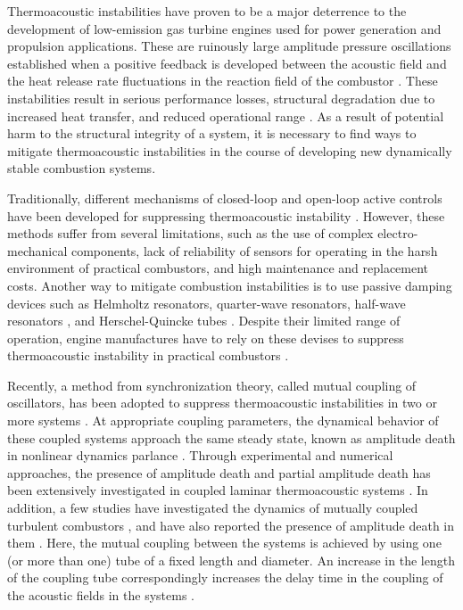 \documentclass[%
preprint,
 amsmath,amssymb,
 aps,
 pra,
]{revtex4-2}
\begin{document}
Thermoacoustic instabilities have proven to be a major deterrence to the development of low-emission gas turbine engines used for power generation and propulsion applications. These are ruinously large amplitude pressure oscillations established when a positive feedback is developed between the acoustic field and the heat release rate fluctuations in the reaction field of the combustor \cite{ sujith2021thermoacoustic}. These instabilities result in serious performance losses, structural degradation due to increased heat transfer, and reduced operational range \cite{culick2006unsteady}. As a result of potential harm to the structural integrity of a system, it is necessary to find ways to mitigate thermoacoustic instabilities in the course of developing new dynamically stable combustion systems.

Traditionally, different mechanisms of closed-loop and open-loop active controls have been developed for  suppressing thermoacoustic instability \cite{dowling2005feedback}. However, these methods suffer from several limitations, such as the use of complex electro-mechanical components, lack of reliability of sensors for operating in the harsh environment of practical combustors, and high maintenance and replacement costs. Another way to mitigate combustion instabilities is to use passive damping devices such as Helmholtz resonators, quarter-wave resonators, half-wave resonators \cite{zhao2015review}, and Herschel-Quincke tubes \cite{park2008thermo, rajaram2012attenuation}. Despite their limited range of operation, engine manufactures have to rely on these devises to suppress thermoacoustic instability in practical combustors \cite{bellucci2004use}. 

Recently, a method from synchronization theory, called mutual coupling of oscillators, has been adopted to suppress thermoacoustic instabilities in two or more systems \cite{sujith2021thermoacoustic}. At appropriate coupling parameters, the dynamical behavior of these coupled systems approach the same steady state, known as amplitude death in nonlinear dynamics parlance \cite{zou2021quenching}. Through experimental and numerical approaches, the presence of amplitude death and partial amplitude death has been extensively investigated in coupled laminar thermoacoustic systems \cite{thomas2018effect1, dange2019oscillation, hyodo2020suppression, srikanth2021dynamical}. In addition, a few studies have investigated the dynamics of mutually coupled turbulent combustors \cite{thomas2018effect, jegal2019mutual, moon2020mutual, guan2021low}, and have also reported the presence of amplitude death in them \cite{jegal2019mutual}. Here, the mutual coupling between the systems is achieved by using one (or more than one) tube of a fixed length and diameter. An increase in the length of the coupling tube correspondingly increases the delay time in the coupling of the acoustic fields in the systems \cite{dange2019oscillation, sahay2021dynamics}.
\end{document}
